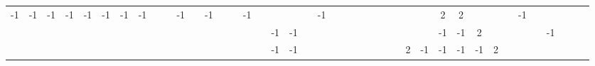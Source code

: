 \begin{table}[H]
{\begin{tabular}{ccccccccccccccccccccccccccccccccccccccccc}
-1 & -1 & -1                        & -1                        & -1                        & -1                        & -1                        & -1                        &                           &                           & -1                        &                           & -1                        &                           &                           & -1                        &                           &                           &                           &                           & -1                        &                           &                           &    &    &    &                           &                           &                           &                           & \cellcolor[HTML]{FE0000}2 & \cellcolor[HTML]{FE0000}2 &                           &                           &                           & -1                        &                           &                           &  &  &  \\
   &    &                           &                           &                           &                           &                           &                           &                           &                           &                           &                           &                           &                           &                           &                           &                           & -1                        & -1                        &                           &                           &                           &                           &    &    &    &                           &                           &                           & \cellcolor[HTML]{FE0000}  & -1                        & -1                        & \cellcolor[HTML]{FE0000}2 &                           &                           &                           &                           & -1                        &  &  &  \\
   &    &                           &                           &                           &                           &                           &                           &                           &                           &                           &                           &                           &                           &                           &                           &                           & -1                        & -1                        &                           &                           &                           &                           &    &    &    &                           &                           & \cellcolor[HTML]{FE0000}2 & -1                        & -1                        & -1                        & -1                        & \cellcolor[HTML]{FE0000}2 &                           &                           &                           &                           &  &  &  \\

\end{tabular}}
\end{table}
